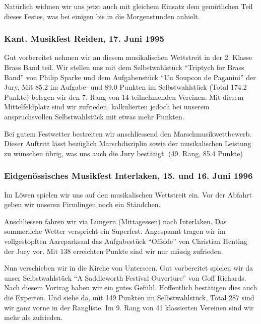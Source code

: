 \begin{history}
    Natürlich widmen wir uns jetzt auch mit gleichem Einsatz dem gemütlichen
    Teil dieses Festes, was bei einigen bis in die Morgenstunden anhielt.


    \subsubsection*{Kant. Musikfest Reiden, 17. Juni 1995}

    Gut vorbereitet nehmen wir an diesem musikalischen Wettstreit in der 2.
    Klasse Brass Band teil. Wir stellen uns mit dem Selbstwahlstück
    \enquote{Triptych for Brass Band} von Philip Sparke und dem Aufgabenstück
    \enquote{Un Soupcon de Paganini} der Jury. Mit 85.2 im Aufgabe- und 89.0
    Punkten im Selbstwahlstück (Total 174.2 Punkte) belegen wir den 7. Rang von
    14 teilnehmenden Vereinen. Mit diesem Mittelfeldplatz sind wir zufrieden,
    kalkulierten jedoch bei unserem anspruchsvollen Selbstwahlstück mit etwas
    mehr Punkten.

    Bei gutem Festwetter bestreiten wir anschliessend den Marschmusikwettbewerb.
    Dieser Auftritt lässt bezüglich Marschdisziplin sowie der musikalischen
    Leistung zu wünschen übrig, was uns auch die Jury bestätigt. (49. Rang, 85.4
    Punkte)


    \subsubsection*{Eidgenössisches Musikfest Interlaken, 15. und 16. Juni 1996}

    Im Löwen spielen wir uns auf den musikalischen Wettstreit ein. Vor der
    Abfahrt geben wir unseren Firmlingen noch ein Ständchen.

    Anschliessen fahren wir via Lungern (Mittagessen) nach Interlaken. Das
    sommerliche Wetter verspricht ein Superfest. Angespannt tragen wir im
    vollgestopften Aareparksaal das Aufgabestück \enquote{Offside} von Christian
    Henting der Jury vor. Mit 138 erreichten Punkte sind wir nur mässig
    zufrieden.

    Nun verschieben wir in die Kirche von Unterseen. Gut vorbereitet spielen wir
    da unser Selbstwahlstück \enquote{A Saddleworth Festival Ouverture} von Goff
    Richards. Nach diesem Vortrag haben wir ein gutes Gefühl. Hoffentlich
    bestätigen dies auch die Experten. Und siehe da, mit 149 Punkten im
    Selbstwahlstück, Total 287 sind wir ganz vorne in der Rangliste. Im 9. Rang
    von 41 klassierten Vereinen sind wir mehr als zufrieden.


\end{history}
